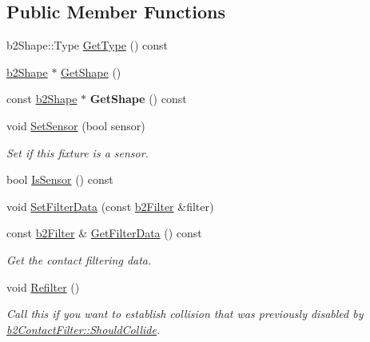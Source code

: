 \subsection*{Public Member Functions}
\begin{DoxyCompactItemize}
\item 
b2\+Shape\+::\+Type \hyperlink{classb2Fixture_a7a566c1e3b768f6a72ebc3b758aad70e}{Get\+Type} () const
\item 
\hyperlink{classb2Shape}{b2\+Shape} $\ast$ \hyperlink{classb2Fixture_aaa2b73fa212fa53b1c800cccd7a1d31e}{Get\+Shape} ()
\item 
\mbox{\label{classb2Fixture_a783f8bcb19eee659686284872e70f383}} 
const \hyperlink{classb2Shape}{b2\+Shape} $\ast$ {\bfseries Get\+Shape} () const
\item 
\mbox{\label{classb2Fixture_a6198a81dcee0fe814d730383ebfa7038}} 
void \hyperlink{classb2Fixture_a6198a81dcee0fe814d730383ebfa7038}{Set\+Sensor} (bool sensor)
\begin{DoxyCompactList}\small\item\em Set if this fixture is a sensor. \end{DoxyCompactList}\item 
bool \hyperlink{classb2Fixture_aedd23d27ff7ce2d53b6c5b7a878a35d3}{Is\+Sensor} () const
\item 
void \hyperlink{classb2Fixture_a2c5e0d12c174927a4ad550459be334ad}{Set\+Filter\+Data} (const \hyperlink{structb2Filter}{b2\+Filter} \&filter)
\item 
\mbox{\label{classb2Fixture_ad956250d9f684a407992ec178320127e}} 
const \hyperlink{structb2Filter}{b2\+Filter} \& \hyperlink{classb2Fixture_ad956250d9f684a407992ec178320127e}{Get\+Filter\+Data} () const
\begin{DoxyCompactList}\small\item\em Get the contact filtering data. \end{DoxyCompactList}\item 
\mbox{\label{classb2Fixture_a45d3320f94811d67383c48466165fa26}} 
void \hyperlink{classb2Fixture_a45d3320f94811d67383c48466165fa26}{Refilter} ()
\begin{DoxyCompactList}\small\item\em Call this if you want to establish collision that was previously disabled by \hyperlink{classb2ContactFilter_aac8f6155d1f577d125db587f5269289b}{b2\+Contact\+Filter\+::\+Should\+Collide}. \end{DoxyCompactList}\item 

\end{DoxyCompactItemize}
